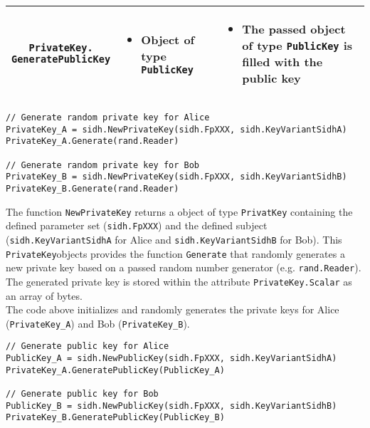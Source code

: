 \begin{table}[H]
\begin{tabular}{| c|m{4.8cm}|m{4.8cm}|}
        \makecell{\texttt{PrivateKey.}\\\texttt{GeneratePublicKey}} &
                \begin{itemize}[noitemsep, leftmargin=*]
            \item Object of type \texttt{PublicKey}
        \end{itemize} & 
        \begin{itemize}[noitemsep, leftmargin=*]
            \item The passed object of type \texttt{PublicKey} is filled with the public key
        \end{itemize} \\
        \hline
    \end{tabular}
\end{table}



\begin{lstlisting}[]
// Generate random private key for Alice
PrivateKey_A = sidh.NewPrivateKey(sidh.FpXXX, sidh.KeyVariantSidhA)
PrivateKey_A.Generate(rand.Reader)

// Generate random private key for Bob
PrivateKey_B = sidh.NewPrivateKey(sidh.FpXXX, sidh.KeyVariantSidhB)
PrivateKey_B.Generate(rand.Reader)
\end{lstlisting}
The function \texttt{NewPrivateKey} returns a object of type \texttt{PrivatKey} containing the defined parameter set (\texttt{sidh.FpXXX}) and the defined subject (\texttt{sidh.KeyVariantSidhA} for Alice and \texttt{sidh.KeyVariantSidhB} for Bob). This \texttt{PrivateKey}objects provides the function \texttt{Generate} that randomly generates a new private key based on a passed random number generator (e.g. \texttt{rand.Reader}). The generated private key is stored within the attribute \texttt{PrivateKey.Scalar} as an array of bytes.\\
The code above initializes and randomly generates the private keys for Alice (\textcolor{keywordcol}{\texttt{PrivateKey\_A}}) and Bob (\textcolor{keywordcol}{\texttt{PrivateKey\_B}}).\\

\begin{lstlisting}[]
// Generate public key for Alice
PublicKey_A = sidh.NewPublicKey(sidh.FpXXX, sidh.KeyVariantSidhA)
PrivateKey_A.GeneratePublicKey(PublicKey_A)

// Generate public key for Bob
PublicKey_B = sidh.NewPublicKey(sidh.FpXXX, sidh.KeyVariantSidhB)
PrivateKey_B.GeneratePublicKey(PublicKey_B)
\end{lstlisting}

